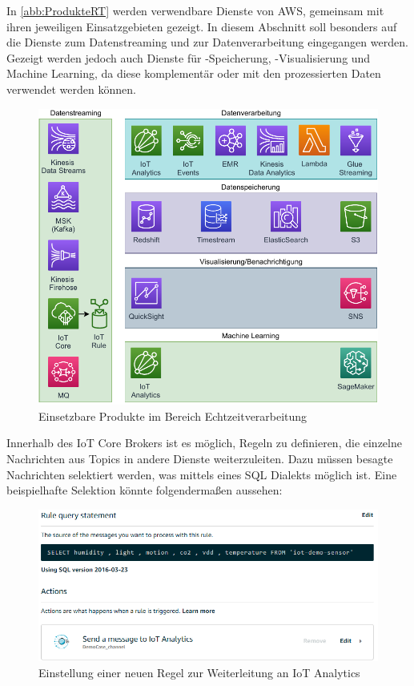 In \autoref{abb:ProdukteRT} werden verwendbare Dienste von \ac{AWS}, gemeinsam mit ihren jeweiligen Einsatzgebieten gezeigt. In diesem Abschnitt soll besonders auf die Dienste zum Datenstreaming und zur Datenverarbeitung eingegangen werden. Gezeigt werden jedoch auch Dienste für -Speicherung, -Visualisierung und Machine Learning, da diese komplementär oder mit den prozessierten Daten verwendet werden können.
\begin{figure}[H]
\centering
\includegraphics[width=\textwidth]{graphics/Overview-Realtime.pdf}
\caption{Einsetzbare Produkte im Bereich Echtzeitverarbeitung}
\label{abb:ProdukteRT}
\end{figure}


Innerhalb des \ac{IoT} Core Brokers ist es möglich, Regeln zu definieren, die einzelne Nachrichten aus Topics in andere Dienste weiterzuleiten. Dazu müssen besagte Nachrichten selektiert werden, was mittels eines SQL Dialekts möglich ist. Eine beispielhafte Selektion könnte folgendermaßen aussehen: 


\begin{figure}[H]
\centering
\includegraphics[width=\textwidth]{graphics/IoT-Rules-console.png}
\caption{Einstellung einer neuen Regel zur Weiterleitung an IoT Analytics}
\label{abb:IoTRulesExample}
\end{figure}

